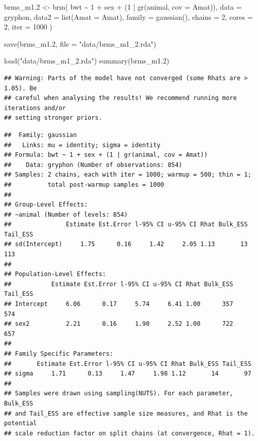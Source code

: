 \documentclass[
  12pt,
]{book}
\newenvironment{Shaded}{\begin{snugshade}}{\end{snugshade}}
\newcommand{\AttributeTok}[1]{\textcolor[rgb]{0.77,0.63,0.00}{#1}}
\newcommand{\DecValTok}[1]{\textcolor[rgb]{0.00,0.00,0.81}{#1}}
\newcommand{\FloatTok}[1]{\textcolor[rgb]{0.00,0.00,0.81}{#1}}
\newcommand{\FunctionTok}[1]{\textcolor[rgb]{0.00,0.00,0.00}{#1}}
\newcommand{\NormalTok}[1]{#1}
\newcommand{\OtherTok}[1]{\textcolor[rgb]{0.56,0.35,0.01}{#1}}
\newcommand{\SpecialCharTok}[1]{\textcolor[rgb]{0.00,0.00,0.00}{#1}}
\newcommand{\StringTok}[1]{\textcolor[rgb]{0.31,0.60,0.02}{#1}}
\begin{document}
\begin{Shaded}
\begin{Highlighting}[]
\NormalTok{brms\_m1}\FloatTok{.2} \OtherTok{\textless{}{-}} \FunctionTok{brm}\NormalTok{(}
\NormalTok{  bwt }\SpecialCharTok{\textasciitilde{}} \DecValTok{1} \SpecialCharTok{+}\NormalTok{ sex }\SpecialCharTok{+}\NormalTok{ (}\DecValTok{1} \SpecialCharTok{|} \FunctionTok{gr}\NormalTok{(animal, }\AttributeTok{cov =}\NormalTok{ Amat)),}
  \AttributeTok{data =}\NormalTok{ gryphon,}
  \AttributeTok{data2 =} \FunctionTok{list}\NormalTok{(}\AttributeTok{Amat =}\NormalTok{ Amat),}
  \AttributeTok{family =} \FunctionTok{gaussian}\NormalTok{(),}
  \AttributeTok{chains =} \DecValTok{2}\NormalTok{, }\AttributeTok{cores =} \DecValTok{2}\NormalTok{, }\AttributeTok{iter =} \DecValTok{1000}
\NormalTok{)}

\FunctionTok{save}\NormalTok{(brms\_m1}\FloatTok{.2}\NormalTok{, }\AttributeTok{file =} \StringTok{"data/brms\_m1\_2.rda"}\NormalTok{)}
\end{Highlighting}
\end{Shaded}

\begin{Shaded}
\begin{Highlighting}[]
\FunctionTok{load}\NormalTok{(}\StringTok{"data/brms\_m1\_2.rda"}\NormalTok{)}
\FunctionTok{summary}\NormalTok{(brms\_m1}\FloatTok{.2}\NormalTok{)}
\end{Highlighting}
\end{Shaded}

\begin{verbatim}
## Warning: Parts of the model have not converged (some Rhats are > 1.05). Be
## careful when analysing the results! We recommend running more iterations and/or
## setting stronger priors.
\end{verbatim}

\begin{verbatim}
##  Family: gaussian 
##   Links: mu = identity; sigma = identity 
## Formula: bwt ~ 1 + sex + (1 | gr(animal, cov = Amat)) 
##    Data: gryphon (Number of observations: 854) 
## Samples: 2 chains, each with iter = 1000; warmup = 500; thin = 1;
##          total post-warmup samples = 1000
## 
## Group-Level Effects: 
## ~animal (Number of levels: 854) 
##               Estimate Est.Error l-95% CI u-95% CI Rhat Bulk_ESS Tail_ESS
## sd(Intercept)     1.75      0.16     1.42     2.05 1.13       13      113
## 
## Population-Level Effects: 
##           Estimate Est.Error l-95% CI u-95% CI Rhat Bulk_ESS Tail_ESS
## Intercept     6.06      0.17     5.74     6.41 1.00      357      574
## sex2          2.21      0.16     1.90     2.52 1.00      722      657
## 
## Family Specific Parameters: 
##       Estimate Est.Error l-95% CI u-95% CI Rhat Bulk_ESS Tail_ESS
## sigma     1.71      0.13     1.47     1.98 1.12       14       97
## 
## Samples were drawn using sampling(NUTS). For each parameter, Bulk_ESS
## and Tail_ESS are effective sample size measures, and Rhat is the potential
## scale reduction factor on split chains (at convergence, Rhat = 1).
\end{verbatim}
\end{document}
